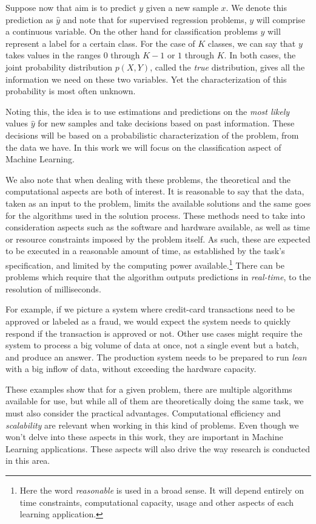 Suppose now that aim is to predict $y$ given a new sample $x$.
We denote this prediction as $\hat{y}$ and note that for supervised regression problems, $y$ will comprise a continuous variable.
On the other hand for classification problems $y$ will represent a label for a certain class.
For the case of $K$ classes, we can say that $y$ takes values in the ranges $0$ through $K-1$ or $1$ through $K$.
In both cases, the joint probability distribution $p(X, Y)$, called the \textit{true} distribution, gives all the information we need on these two variables.
Yet the characterization of this probability is most often unknown.

Noting this, the idea is to use estimations and predictions on the \textit{most likely} values $\hat{y}$ for new samples and take decisions based on past information.
These decisions will be based on a probabilistic characterization of the problem, from the data we have.
In this work we will focus on the classification aspect of Machine Learning.

We also note that when dealing with these problems, the theoretical and the computational aspects are both of interest.
It is reasonable to say that the data, taken as an input to the problem, limits the available solutions and the same goes for the algorithms used in the solution process.
These methods need to take into consideration aspects such as the software and hardware available, as well as time or resource constraints imposed by the problem itself.
As such, these are expected to be executed in a reasonable amount of time, as established by the task's specification, and limited by the computing power available.\footnote{Here the word \textit{reasonable} is used in a broad sense.
It will depend entirely on time constraints, computational capacity, usage and other aspects of each learning application.} There can be problems which require that the algorithm outputs predictions in \textit{real-time}, to the resolution of milliseconds.

For example, if we picture a system where credit-card transactions need to be approved or labeled as a fraud, we would expect the system needs to quickly respond if the transaction is approved or not.
Other use cases might require the system to process a big volume of data at once, not a single event but a batch, and produce an answer.
The production system needs to be prepared to run \textit{lean} with a big inflow of data, without exceeding the hardware capacity.

These examples show that for a given problem, there are multiple algorithms available for use, but while all of them are theoretically doing the same task, we must also consider the practical advantages.
Computational efficiency and \textit{scalability} are relevant when working in this kind of problems.
Even though we won't delve into these aspects in this work, they are important in Machine Learning applications.
These aspects will also drive the way research is conducted in this area.


